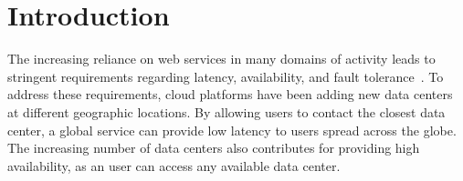 \documentclass[sigplan,review,anonymous]{acmart}
\begin{document}
%

\section{Introduction}
\label{sec:introduction}


The increasing reliance on web services in many domains of activity leads to stringent requirements regarding latency, availability,
and fault tolerance~\cite{Schurman2009latency,gomez}.
To address these requirements, cloud platforms have been adding new data centers at different geographic 
locations. By allowing users to contact the closest data center, a global service can
provide low latency to users spread across the globe. 
The increasing number of data centers also contributes
for providing high availability,  as an user can access any
available data center.
\end{document}
